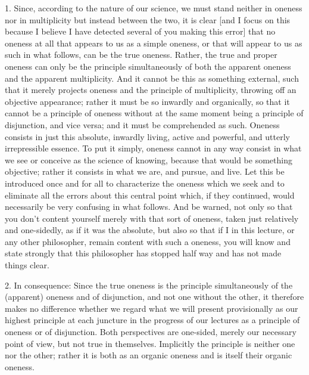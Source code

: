 1. Since, according to the nature of our science,
we must stand neither in oneness nor in multiplicity
but instead between the two, it is clear
[and I focus on this because I believe
I have detected several of you making this error]
that no oneness at all
that appears to us as a simple oneness,
or that will appear to us as such in what follows,
can be the true oneness.
Rather, the true and proper oneness
can only be the principle simultaneously
of both the apparent oneness
and the apparent multiplicity.
And it cannot be this as something external,
such that it merely projects oneness
and the principle of multiplicity,
throwing off an objective appearance;
rather it must be so inwardly and organically,
so that it cannot be a principle of oneness
without at the same moment being
a principle of disjunction, and vice versa;
and it must be comprehended as such.
Oneness consists in just this absolute, inwardly living,
active and powerful, and utterly irrepressible essence.
To put it simply, oneness cannot in any way consist
in what we see or conceive as the science of knowing,
because that would be something objective;
rather it consists in what we are, and pursue, and live.
Let this be introduced once and for all
to characterize the oneness which we seek
and to eliminate all the errors about this central point
which, if they continued, would necessarily
be very confusing in what follows.
And be warned, not only so that you don't
content yourself merely with that sort of oneness,
taken just relatively and one-sidedly,
as if it was the absolute,
but also so that if I in this lecture,
or any other philosopher,
remain content with such a oneness,
you will know and state strongly that
this philosopher has stopped half way
and has not made things clear.

2. In consequence:
Since the true oneness is
the principle simultaneously of
the (apparent) oneness and of disjunction,
and not one without the other,
it therefore makes no difference
whether we regard what we will present
provisionally as our highest principle
at each juncture in the progress of our lectures
as a principle of oneness or of disjunction.
Both perspectives are one-sided,
merely our necessary point of view,
but not true in themselves.
Implicitly the principle is neither one nor the other;
rather it is both as an organic oneness
and is itself their organic oneness.

